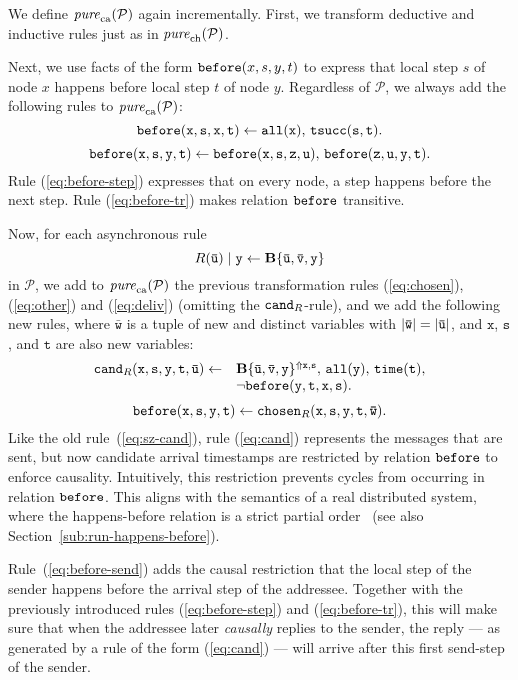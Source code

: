 \documentclass{tlp}
\newcommand{\ded}{\mathcal{P}}
\newcommand{\var}[1]{\mathtt{#1}}
\newcommand{\tvar}[1]{\mathtt{\bar{#1}}}
\newcommand{\before}{\pred{before}}
\newcommand{\chosen}{\pred{chosen}}
\newcommand{\cand}{\pred{cand}}
\newcommand{\purech}[1]{\fname{pure}_{\mathrm{ch}}(#1)}
\newcommand{\purecaus}[1]{\fname{pure}_{\mathrm{ca}}(#1)}
\begin{document}
\newcommand{\rulebeforesend}[1]{\before(\var x,\var s,\var y,\var t)\gets\chosen_{R}(\var x,\var s,\var y,\var t,\tvar w)#1}


We define $\purecaus{\ded}$ again incrementally. First, we transform
deductive and inductive rules just as in $\purech{\ded}$. 

Next, we use facts of the form $\before(x,s,y,t)$ to express that
local step $s$ of node $x$ happens before local step $t$ of node
$y$. Regardless of $\ded$, we always add the following rules to
$\purecaus{\ded}$:
\begin{equation}
\rulebeforestep .\label{eq:before-step}
\end{equation}
\begin{equation}
\rulebeforetr .\label{eq:before-tr}
\end{equation}
Rule (\ref{eq:before-step}) expresses that on every node, a step
happens before the next step. Rule (\ref{eq:before-tr}) makes relation
$\before$ transitive.

Now, for each asynchronous rule 
\[
R(\tvar u)\sugas{\var y}\gets\simplebody{\tvar u,\tvar v,\var y}
\]
in $\ded$, we add to $\purecaus{\ded}$ the previous transformation
rules (\ref{eq:chosen}), (\ref{eq:other}) and (\ref{eq:deliv})
(omitting the $\cand_{R}$-rule), and we add the following new rules,
where $\tvar w$ is a tuple of new and distinct variables with $\len{\tvar w}=\len{\tvar u}$,
and $\var x$, $\var s$, and $\var t$ are also new variables:
\begin{equation}
\rulecandidate .\label{eq:cand}
\end{equation}
\begin{equation}
\rulebeforesend .\label{eq:before-send}
\end{equation}
Like the old rule~(\ref{eq:sz-cand}), rule (\ref{eq:cand}) represents
the messages that are sent, but now candidate arrival timestamps are
restricted by relation $\before$ to enforce causality. Intuitively,
this restriction prevents cycles from occurring in relation $\before$.
This aligns with the semantics of a real distributed system, where
the happens-before relation is a strict partial order~\cite{attiyawelch_dcbook}
(see also Section~\ref{sub:run-happens-before}).

Rule~(\ref{eq:before-send}) adds the causal restriction that the
local step of the sender happens before the arrival step of the addressee.
Together with the previously introduced rules (\ref{eq:before-step})
and (\ref{eq:before-tr}), this will make sure that when the addressee
later \emph{causally} replies to the sender, the reply --- as generated
by a rule of the form (\ref{eq:cand}) --- will arrive after this
first send-step of the sender.
\end{document}
